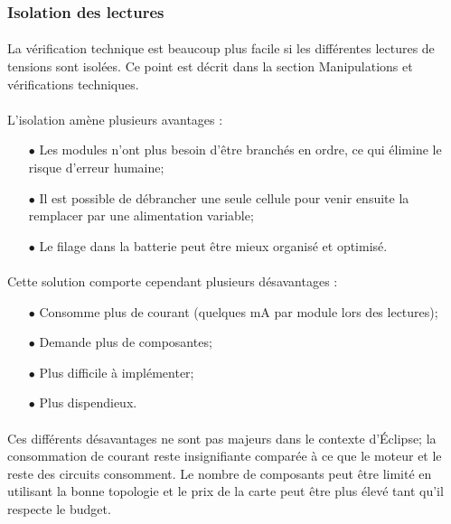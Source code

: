 	
	\subsubsection*{Isolation des lectures}
	\paragraph*{}
	La vérification technique est beaucoup plus facile si les différentes lectures de tensions sont isolées. Ce point est décrit dans la section Manipulations et vérifications techniques. 
	
	\paragraph*{}
	L'isolation amène plusieurs avantages :
	
	\begin{itemize}
		\item[$\bullet$] Les modules n'ont plus besoin d'être branchés en ordre, ce qui élimine le risque d'erreur humaine;
		\item[$\bullet$] Il est possible de débrancher une seule cellule pour venir ensuite la remplacer par une alimentation variable;
		\item[$\bullet$] Le filage dans la batterie peut être mieux organisé et optimisé.
	\end{itemize}

	\paragraph*{}
	Cette solution comporte cependant plusieurs désavantages :
	
	\begin{itemize}
		\item[$\bullet$] Consomme plus de courant (quelques mA par module lors des lectures);
		\item[$\bullet$] Demande plus de composantes;
		\item[$\bullet$] Plus difficile à implémenter;
		\item[$\bullet$] Plus dispendieux.
	\end{itemize}
	
	\paragraph*{}
	Ces différents désavantages ne sont pas majeurs dans le contexte d'Éclipse; la consommation de courant reste insignifiante comparée à ce que le moteur et le reste des circuits consomment. Le nombre de composants peut être limité en utilisant la bonne topologie et le prix de la carte peut être plus élevé tant qu'il respecte le budget. 
	
